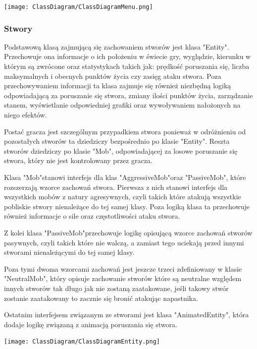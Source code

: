 \documentclass{article}
\begin{document}
\begin{center}
     \texttt{[image: ClassDiagram/ClassDiagramMenu.png]}
\end{center}

\subsubsection{Stwory}
Podstawową klasą zajmującą się zachowaniem stworów jest klasa "Entity". Przechowuje ona informacje o ich położeniu w świecie gry, wyglądzie, kierunku w którym są zwrócone oraz statystykach takich jak: prędkość poruszania się, liczba maksymalnych i obecnych punktów życia czy zasięg ataku stwora. Poza przechowywaniem informacji ta klasa zajmuje się również niezbędną logiką odpowiadającą za poruszanie się stwora, zmiany ilości punktów życia, zarządzanie stanem, wyświetlanie odpowiedniej grafiki oraz wywoływaniem nałożonych na niego efektów.

Postać gracza jest szczególnym przypadkiem stwora ponieważ w odróżnieniu od pozostałych stworów ta dziedziczy bezpośrednio po klasie "Entity". Reszta stworów dziedziczy po klasie "Mob", odpowiadającej za losowe poruszanie się stwora, który nie jest kontrolowany przez gracza.

Klasa "Mob"\space stanowi interfejs dla klas "AggressiveMob"\space oraz "PassiveMob", które rozszerzają wzorce zachowań stwora. Pierwsza z nich stanowi interfejs dla wszystkich mobów z natury agresywnych, czyli takich które atakują wszystkie pobliskie stwory nienależące do tej samej klasy. Poza logiką klasa ta przechowuje również informacje o sile oraz częstotliwości ataku stwora.

Z kolei klasa "PassiveMob"\space przechowuje logikę opisującą wzorce zachowań stworów pasywnych, czyli takich które nie walczą, a zamiast tego uciekają przed innymi stworami nienależącymi do tej samej klasy.

Poza tymi dwoma wzorcami zachowań jest jeszcze trzeci zdefiniowany w klasie "NeutralMob", który opisuje zachowanie stworów które są neutralne względem innych stworów tak długo jak nie zostaną zaatakowane, jeśli takowy stwór zostanie zaatakowany to zacznie się bronić atakując napastnika.

Ostatnim interfejsem związanym ze stworami jest klasa "AnimatedEntity", która dodaje logikę związaną z animacją poruszania się stwora.

\begin{center}
     \texttt{[image: ClassDiagram/ClassDiagramEntity.png]}
\end{center}
\end{document}
